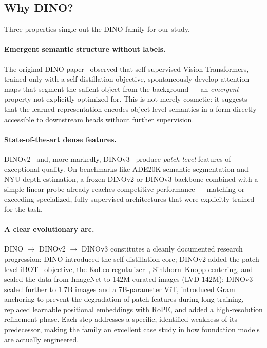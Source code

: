 \documentclass[11pt,a4paper]{article}
\begin{document}
\subsection{Why DINO?}

Three properties single out the DINO family for our study.

\paragraph{Emergent semantic structure without labels.}
The original DINO paper~\citep{caron2021emerging} observed that
self-supervised Vision Transformers, trained only with a self-distillation
objective, spontaneously develop attention maps that segment the salient
object from the background --- an \emph{emergent} property not explicitly
optimized for. This is not merely cosmetic: it suggests that the learned
representation encodes object-level semantics in a form directly accessible
to downstream heads without further supervision.

\paragraph{State-of-the-art dense features.}
DINOv2~\citep{oquab2024dinov2} and, more markedly, DINOv3~\citep{simeoni2025dinov3}
produce \emph{patch-level} features of exceptional quality. On benchmarks
like ADE20K semantic segmentation and NYU depth estimation, a frozen DINOv2
or DINOv3 backbone combined with a simple linear probe already reaches
competitive performance --- matching or exceeding specialized, fully
supervised architectures that were explicitly trained for the task.

\paragraph{A clear evolutionary arc.}
DINO $\to$ DINOv2 $\to$ DINOv3 constitutes a cleanly documented research
progression: DINO introduced the self-distillation core; DINOv2 added the
patch-level iBOT~\citep{zhou2021ibot} objective, the KoLeo
regularizer~\citep{sablayrolles2018spreading}, Sinkhorn--Knopp centering,
and scaled the data from ImageNet to 142M curated images (LVD-142M);
DINOv3 scaled further to 1.7B images and a 7B-parameter ViT, introduced
Gram anchoring to prevent the degradation of patch features during long
training, replaced learnable positional embeddings with RoPE, and added a
high-resolution refinement phase. Each step addresses a specific, identified
weakness of its predecessor, making the family an excellent case study in
how foundation models are actually engineered.
\end{document}
